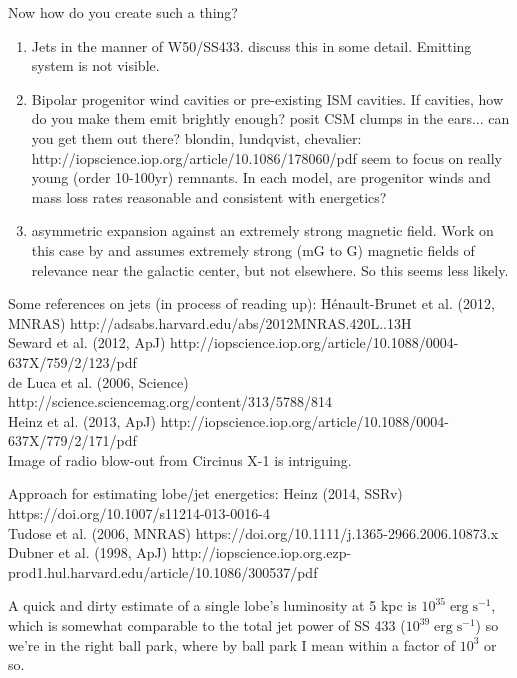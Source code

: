 \documentclass[twocolumn,tighten,trackchanges]{aastex61}
\newcommand*{\mt}{\mathrm}
\newcommand*{\unit}[1]{\;\mt{#1}}  %
\begin{document}
Now how do you create such a thing?
\begin{enumerate}
    \item Jets in the manner of W50/SS433.   discuss
        this in some detail.  Emitting system is not visible.
    \item Bipolar progenitor wind cavities or pre-existing ISM cavities.
    If cavities, how do you make them emit brightly enough?
    \citet{tsebrenko2013} posit CSM clumps in the ears... can you get them out there?
    blondin, lundqvist, chevalier: http://iopscience.iop.org/article/10.1086/178060/pdf
        seem to focus on really young (order 10-100yr) remnants.
    In each model, are progenitor winds and mass loss rates reasonable and
    consistent with energetics?
    \item asymmetric expansion against an extremely strong magnetic field.
    Work on this case by \citet{insertis1991} and \citet{rozyczka1995}
    assumes extremely strong (mG to G) magnetic fields of relevance near the
    galactic center, but not elsewhere.  So this seems less likely.
\end{enumerate}

Some references on jets (in process of reading up):
H\'{e}nault-Brunet et al. (2012, MNRAS) http://adsabs.harvard.edu/abs/2012MNRAS.420L..13H \\
Seward et al. (2012, ApJ) http://iopscience.iop.org/article/10.1088/0004-637X/759/2/123/pdf \\
de Luca et al. (2006, Science) http://science.sciencemag.org/content/313/5788/814 \\
Heinz et al. (2013, ApJ) http://iopscience.iop.org/article/10.1088/0004-637X/779/2/171/pdf \\
Image of radio blow-out from Circinus X-1 is intriguing.

Approach for estimating lobe/jet energetics:
Heinz (2014, SSRv) https://doi.org/10.1007/s11214-013-0016-4 \\
Tudose et al. (2006, MNRAS) https://doi.org/10.1111/j.1365-2966.2006.10873.x \\
Dubner et al. (1998, ApJ) http://iopscience.iop.org.ezp-prod1.hul.harvard.edu/article/10.1086/300537/pdf

A quick and dirty estimate of a single lobe's luminosity at 5 kpc is
$10^{35} \unit{erg\;s^{-1}}$, which is somewhat comparable to the total jet
power of SS 433 ($10^{39} \unit{erg\;s^{-1}}$) so we're in the right ball park,
where by ball park I mean within a factor of $10^{3}$ or so.
\end{document}
